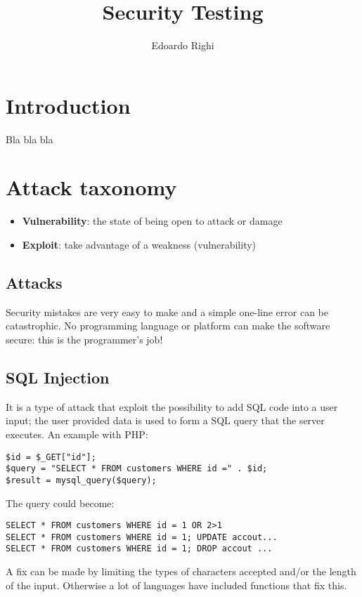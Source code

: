 \documentclass[a4paper, 10pt, titlepage]{article}
\begin{document}
	\title{Security Testing}
	\author{Edoardo Righi}
	\maketitle
	
	\section{Introduction}
	Bla bla bla
	
	\newpage
	\section{Attack taxonomy}
	\begin{itemize}
	\item \textbf{Vulnerability}: the state of being open to attack or damage
	\item \textbf{Exploit}: take advantage of a weakness (vulnerability)
	\end{itemize}
	\subsection{Attacks}
	Security mistakes are very easy to make and a simple one-line error can be catastrophic. No programming language or platform can make the software secure: this is the programmer’s job!
	
	\subsection*{SQL Injection}
	It is a type of attack that exploit the possibility to add SQL code into a user input; the user provided data is used to form a SQL query that the server executes. An example with PHP:
	\begin{lstlisting}
$id = $_GET["id"];
$query = "SELECT * FROM customers WHERE id =" . $id;
$result = mysql_query($query);
	\end{lstlisting}
	The query could become:
	\begin{lstlisting}
SELECT * FROM customers WHERE id = 1 OR 2>1
SELECT * FROM customers WHERE id = 1; UPDATE accout...
SELECT * FROM customers WHERE id = 1; DROP accout ...
	\end{lstlisting}
	A fix can be made by limiting the types of characters accepted and/or the length of the input. Otherwise a lot of languages have included functions that fix this.
	
\end{document}
